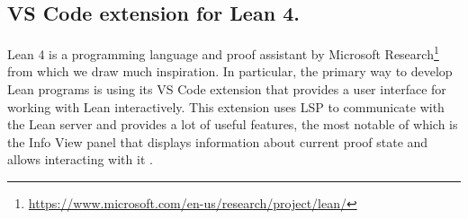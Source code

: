 


\subsection{VS Code extension for Lean 4.}

Lean 4 \cite{deMouraUllrich2021} is a programming language and proof assistant
by Microsoft Research\footnote{\url{https://www.microsoft.com/en-us/research/project/lean/}}
from which we draw much inspiration.
In particular, the primary way to develop Lean programs is using its VS Code
extension that provides a user interface for working with Lean interactively.
This extension uses LSP to communicate with the Lean server and provides a lot
of useful features, the most notable of which is the Info View panel that
displays information about current proof state and allows interacting with it \cite{Nawrocki2023}.
